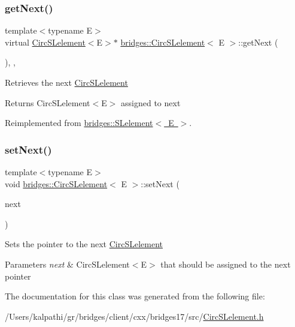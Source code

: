 \subsubsection{\texorpdfstring{get\+Next()}{getNext()}}
{\footnotesize\ttfamily template$<$typename E$>$ \\
virtual \mbox{\hyperlink{classbridges_1_1_circ_s_lelement}{Circ\+S\+Lelement}}$<$E$>$$\ast$ \mbox{\hyperlink{classbridges_1_1_circ_s_lelement}{bridges\+::\+Circ\+S\+Lelement}}$<$ E $>$\+::get\+Next (\begin{DoxyParamCaption}{ }\end{DoxyParamCaption})\hspace{0.3cm}{\ttfamily [inline]}, {\ttfamily [override]}, {\ttfamily [virtual]}}

Retrieves the next \mbox{\hyperlink{classbridges_1_1_circ_s_lelement}{Circ\+S\+Lelement}} \begin{DoxyReturn}{Returns}
Circ\+S\+Lelement$<$\+E$>$ assigned to next 
\end{DoxyReturn}


Reimplemented from \mbox{\hyperlink{classbridges_1_1_s_lelement_a5bd74108a9aa49339378bf62cdbb19ca}{bridges\+::\+S\+Lelement$<$ E $>$}}.

\mbox{\label{classbridges_1_1_circ_s_lelement_a7b2512dd1cc559f0a89d9ab4aafed172}} 
\subsubsection{\texorpdfstring{set\+Next()}{setNext()}}
{\footnotesize\ttfamily template$<$typename E$>$ \\
void \mbox{\hyperlink{classbridges_1_1_circ_s_lelement}{bridges\+::\+Circ\+S\+Lelement}}$<$ E $>$\+::set\+Next (\begin{DoxyParamCaption}\item[{\mbox{\hyperlink{classbridges_1_1_circ_s_lelement}{Circ\+S\+Lelement}}$<$ E $>$ $\ast$}]{next }\end{DoxyParamCaption})\hspace{0.3cm}{\ttfamily [inline]}}

Sets the pointer to the next \mbox{\hyperlink{classbridges_1_1_circ_s_lelement}{Circ\+S\+Lelement}} 
\begin{DoxyParams}{Parameters}
{\em next} & Circ\+S\+Lelement$<$\+E$>$ that should be assigned to the next pointer \\
\hline
\end{DoxyParams}


The documentation for this class was generated from the following file\+:\begin{DoxyCompactItemize}
\item 
/\+Users/kalpathi/gr/bridges/client/cxx/bridges17/src/\mbox{\hyperlink{_circ_s_lelement_8h}{Circ\+S\+Lelement.\+h}}\end{DoxyCompactItemize}
